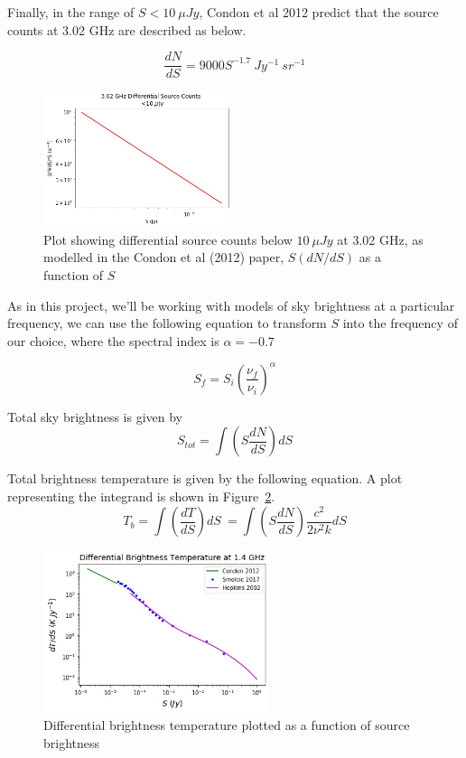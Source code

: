\documentclass[letterpaper, 10pt]{article}
\begin{document}
Finally, in the range of $ S < 10\ \mu Jy$, Condon et al 2012 predict that the source counts at 3.02 GHz are described as below. 

\[ \frac{dN}{dS} = 9000S^{-1.7}\ Jy^{-1}\ sr^{-1} \]


\begin{figure}[h]
\begin{center}
\includegraphics[width=0.49\textwidth]{Condon.jpg}
\caption{Plot showing differential source counts below $10\ \mu Jy$ at 3.02 GHz, as modelled in the Condon et al (2012) paper, $S\left(dN/dS\right)$ as a function of $S$ }
\label{Condon}
\end{center}
\end{figure}

As in this project, we'll be working with models of sky brightness at a particular frequency, we can use the following equation to transform $S$ into the frequency of our choice, where the spectral index is $ \alpha = -0.7$

\[ S_{f} = S_{i} \left(\frac{\nu_{f}}{\nu_{i}}\right)^{\alpha} \]

Total sky brightness is given by 
 \[ S_{tot} = \int \left(S\frac{dN}{dS}\right) dS \]
 
Total brightness temperature is given by the following equation. A plot representing the integrand is shown in Figure~\ref{Tb}.
 \[ T_{b} = \int \left(\frac{dT}{dS}\right) dS \ = \int \left(S\frac{dN}{dS}\right) \frac{c^{2}}{2\nu^{2}k} dS \]
 
\begin{figure}[h]
\begin{center}
\includegraphics[width=0.59\textwidth]{T_b.jpg}
\caption{Differential brightness temperature plotted as a function of source brightness }
\label{Tb}
\end{center}
\end{figure}
\end{document}

